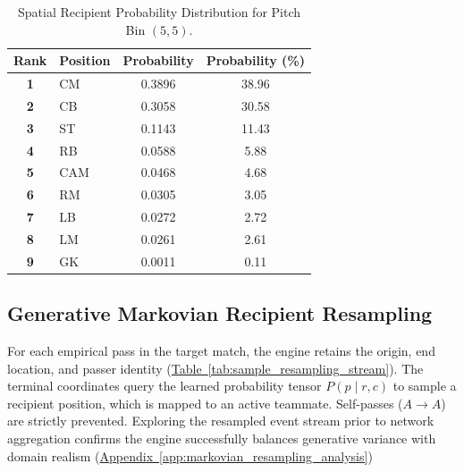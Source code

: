 \documentclass[12pt, a4paper]{article}
\begin{document}
\begin{table}[H]
    \centering
    \small
    \caption{Spatial Recipient Probability Distribution for Pitch Bin $(5,5)$.}
    \label{tab:spatial_recipient_prob_55}
    \begin{tabularx}{0.75\textwidth}{c X c c}
        \toprule
        \textbf{Rank} & \textbf{Position} & \textbf{Probability} & \textbf{Probability (\%)} \\
        \midrule
        \textbf{1} & CM & 0.3896 & 38.96 \\
        \textbf{2} & CB & 0.3058 & 30.58 \\
        \textbf{3} & ST & 0.1143 & 11.43 \\
        \textbf{4} & RB & 0.0588 & 5.88 \\
        \textbf{5} & CAM & 0.0468 & 4.68 \\
        \textbf{6} & RM & 0.0305 & 3.05 \\
        \textbf{7} & LB & 0.0272 & 2.72 \\
        \textbf{8} & LM & 0.0261 & 2.61 \\
        \textbf{9} & GK & 0.0011 & 0.11 \\
        \bottomrule
    \end{tabularx}
\end{table}

\newpage
\subsection{Generative Markovian Recipient Resampling}
\label{subsec:markovian_resampling}

For each empirical pass in the target match, the engine retains the origin, end location, and passer identity (\hyperref[tab:sample_resampling_stream]{Table~\ref{tab:sample_resampling_stream}}). The terminal coordinates query the learned probability tensor $P(p \mid r, c)$ to sample a recipient position, which is mapped to an active teammate. Self-passes ($A \to A$) are strictly prevented. Exploring the resampled event stream prior to network aggregation confirms the engine successfully balances generative variance with domain realism (\hyperref[app:markovian_resampling_analysis]{Appendix~\ref{app:markovian_resampling_analysis}})
\end{document}
